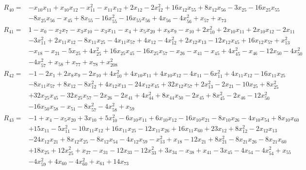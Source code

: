 \begin{align*}
 R_{40}={}&-x_{10}x_{11} +x_{10}x_{12} -x_{11}^{2} -x_{11}x_{12} +2x_{12} -2x_{12}^{2} +16x_{12}x_{55} +8x_{12}x_{56} -3x_{25} -16x_{25}x_{55}\\
 &-8x_{25}x_{56} -x_{45} +8x_{55} -16x_{55}^{2} -16x_{55}x_{56} +4x_{56} -4x_{56}^{2} +x_{57} +x_{73}
\end{align*}
\begin{align*}
 R_{41}={}&1 -x_{0} -x_{2}x_{7} -x_{3}x_{10} -x_{3}x_{11} -x_{4} +x_{5}x_{20} +x_{8}x_{9} -x_{10} +2x_{10}^{2} +2x_{10}x_{11} +2x_{10}x_{12} -2x_{11}\\
 &-3x_{11}^{2} +2x_{11}x_{12} -8x_{11}x_{25} -4x_{11}x_{57} +4x_{12} -4x_{12}^{2} +2x_{12}x_{13} -12x_{12}x_{45} +16x_{12}x_{57} +x_{13}^{2}\\
 &-x_{18} -x_{21} -5x_{25} +4x_{25}^{2} +16x_{25}x_{45} -16x_{25}x_{57} -x_{26} -x_{41} -x_{45} +4x_{45}^{2} -x_{46} -12x_{50} -4x_{50}^{2}\\
 &-4x_{57}^{2} +x_{58} +x_{77} +x_{78} +x_{208}^{2}
\end{align*}
\begin{align*}
 R_{42}={}&-1 -2x_{1} +2x_{8}x_{9} -2x_{10} +4x_{10}^{2} +4x_{10}x_{11} +4x_{10}x_{12} -4x_{11} -6x_{11}^{2} +4x_{11}x_{12} -16x_{11}x_{25}\\
 &-8x_{11}x_{57} +8x_{12} -8x_{12}^{2} +4x_{12}x_{13} -24x_{12}x_{45} +32x_{12}x_{57} +2x_{13}^{2} -2x_{21} -10x_{25} +8x_{25}^{2}\\
 &+32x_{25}x_{45} -32x_{25}x_{57} -2x_{26} -2x_{41} +4x_{44}^{2} +8x_{44}x_{50} -2x_{45} +8x_{45}^{2} -2x_{46} -12x_{50}^{2}\\
 &-16x_{50}x_{58} -x_{51} -8x_{57}^{2} -4x_{58}^{2} +x_{59}
\end{align*}
\begin{align*}
 R_{43}={}&-1 +x_{4} -x_{5}x_{20} +3x_{10} +5x_{10}^{2} -6x_{10}x_{11} +6x_{10}x_{12} -16x_{10}x_{21} -8x_{10}x_{26} -4x_{10}x_{54} +8x_{10}x_{60}\\
 &+15x_{11} -5x_{11}^{2} -10x_{11}x_{12} +16x_{11}x_{25} -12x_{11}x_{26} +16x_{11}x_{60} +23x_{12} +8x_{12}^{2} -2x_{12}x_{13}\\
 &-24x_{12}x_{21} +8x_{12}x_{25} -8x_{12}x_{54} -4x_{12}x_{59} -x_{13}^{2} +x_{18} -12x_{21} +8x_{21}^{2} -8x_{21}x_{26} -8x_{21}x_{60}\\
 &+18x_{25} +12x_{25}^{2} +x_{27} -x_{31} -12x_{33} -12x_{33}^{2} +3x_{34} -x_{38} +x_{41} -3x_{45} -4x_{54} -4x_{54}^{2} +x_{55}\\
 &-4x_{59}^{2} +4x_{60} -4x_{60}^{2} +x_{61} +14x_{73}
\end{align*}
